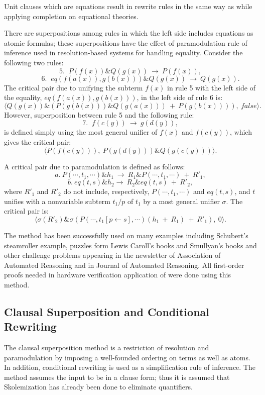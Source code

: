 Unit clauses which are equations result in rewrite rules in the
same way as while applying completion on equational theories.

There are superpositions among rules in which
the left side includes equations as atomic formulas;
these superpositions have the effect of paramodulation rule
of inference used in resolution-based systems for handling equality.
Consider the following two rules:
  \[5. \; \; P(f(x)) \& Q(g(x)) ~\rightarrow~ P(f(x)), \]
  \[~~~~~~~~~~~~~6. \; \; eq(f(a(x)), g(b(x))) \& Q(g(x)) ~\rightarrow ~ Q(g(x)).\]
The critical pair due to unifying the subterm $f(x)$ in rule 5
with the left side
of the equality, $eq(f(a(x)), g(b(x)))$, in the left side of rule 6 is:
  \[\langle Q(g(x)) \& (P(g(b(x))) \& Q(g(a(x))) ~+~P(g(b(x)))), ~false \rangle. \]
However, superposition between rule 5 and the following rule:
   \[7. \; \; f(c(y)) ~\rightarrow~ g(d(y)), \]
is defined simply using the most general unifier of $f(x)$ and $f(c(y))$,
which gives the critical pair:
    \[\langle P(f(c(y))), ~P(g(d(y))) \& Q(g(c(y))) \rangle.\]

A critical pair due to paramodulation is defined as follows:
  \[a. ~ P( \cdots, t_1, \cdots) \& h_1 ~\rightarrow~ R_1 \&  P( \cdots, t_1, \cdots) ~+~ {R'}_1, \]
  \[b. ~ eq(t, s) \& h_2 \rightarrow~ R_2 \& eq(t, s) ~+~ {R'}_2, \]
where ${R'}_1$ and ${R'}_2$ do not include, respectively, 
$P( \cdots, t_1, \cdots)$ and $eq(t, s)$, and $t$ unifies with a nonvariable
subterm ${t_1}/p$ of $t_1$ by a most general unifier $\sigma$. 
The critical pair is:
 \[ \langle \sigma({R'}_2) \& \sigma(P( \cdots, t_1 [p \leftarrow s ], \cdots) ( h_1 ~+~ R_1 ) ~+~ {R'}_1 ), ~0 \rangle . \]

The method has been successfully used on many examples including
Schubert's steamroller example, puzzles form Lewis Caroll's books
and Smullyan's books and other challenge problems appearing in
the newsletter of Association of Automated Reasoning and in
Journal of Automated Reasoning. All first-order proofs needed in
hardware verification application of \RRL were done using this
method. 

\subsection{Clausal Superposition and Conditional Rewriting}

The clausal superposition method is a restriction of resolution
and paramodulation by imposing a well-founded ordering on terms
as well as atoms. In addition, conditional rewriting is used as a
simplification rule of inference.  The method assumes the input
to be in a clause form; thus it is assumed that Skolemization has
already been done to eliminate quantifiers.

